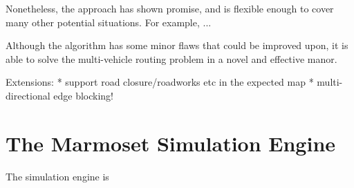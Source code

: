 \documentclass[ %
                    author={Alexander Hill},
                supervisor={Dr. Benjamin Sach},
                    degree={MEng},
                     title={MARMOSET},
                  subtitle={Multi-Agent Route Management using Online Simulation for Efficient Transportation},
                      type={research},
                      year={2016} ]{dissertation}
\begin{document}
Nonetheless, the approach has shown promise, and is flexible enough to cover
many other potential situations. For example, ...

Although the algorithm has some minor flaws that could be improved upon, it is
able to solve the multi-vehicle routing problem in a novel and effective manor.

Extensions:
* support road closure/roadworks etc in the expected map
* multi-directional edge blocking!

\section{The Marmoset Simulation Engine}

The simulation engine is




\end{document}
